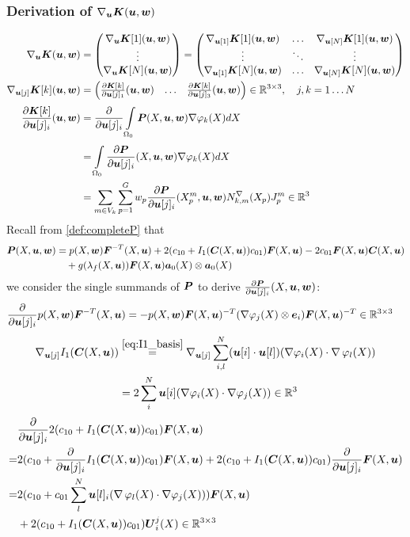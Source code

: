 \subsubsection{Derivation of $\nabla_{\vu}\vK(\vu,\vw)$}
\begin{align*}
	\nabla_{\vu}\vK(\vu,\vw) &= \m{\nabla_{\vu}\vK[1](\vu,\vw)\\ \vdots \\ \nabla_{\vu}\vK[N](\vu,\vw)}
	 = \m{\nabla_{\vu[1]}\vK[1](\vu,\vw) & \ldots & \nabla_{\vu[N]}\vK[1](\vu,\vw)\\
	 	\vdots & \ddots & \vdots\\
	   \nabla_{\vu[1]}\vK[N](\vu,\vw) & \ldots & \nabla_{\vu[N]}\vK[N](\vu,\vw)}\\
	\nabla_{\vu[j]}\vK[k](\vu,\vw) &=\m{\d{\vK[k]}{\vu[j]_1}(\vu,\vw) & \ldots & \d{\vK[k]}{\vu[j]_3}(\vu,\vw)}\in\R^{3\times 3},\quad j,k=1\ldots N\\
	\d{\vK[k]}{\vu[j]_i}(\vu,\vw) &= \d{}{\vu[j]_i} \intor\vP(X,\vu,\vw)\dpk dX\\
		&=  \intor\d{\vP}{\vu[j]_i}(X,\vu,\vw) \dpk dX\\
		&= \sumvk\sumgp w_p \d{\vP}{\vu[j]_i}(\pmp,\vu,\vw) \dNkmp\jmp\in\R^3
\end{align*}
Recall from \eqref{def:completeP} that
\begin{align*}
\vP(X,\vu,\vw) &= p(X,\vw)\vF^{-T}(X,\vu) + 2(c_{10} + I_1(\vC(X,\vu))c_{01})\vF(X,\vu) - 2c_{01}\vF(X,\vu)\vC(X,\vu)\\
	     &\quad+g(\lambda_f(X,\vu))\vF(X,\vu)\va_0(X)\otimes\va_0(X)
\end{align*}
we consider the single summands of $\vP$ to derive $\d{\vP}{\vu[j]_i}(X,\vu,\vw)$:
\begin{align*}
	 \d{}{\vu[j]_i}p(X,\vw)\vF^{-T}(X,\vu) &= -p(X,\vw)\vF(X,\vu)^{-T}(\dpj\otimes\ve_i)\vF(X,\vu)^{-T}\in\R^{3\times 3}
\end{align*}
\begin{align*}
	\nabla_{\vu[j]}I_1(\vC(X,\vu)) &\re{eq:I1_basis} \nabla_{\vu[j]}\suml{i,l}{N} (\vu[i] \cdot \vu[l])(\dpi \cdot \divergence\varphi_l(X))\\
	&= 2\suml{i}{N} \vu[i](\dpi \cdot \dpj) \in\R^3
\end{align*}
\begin{align*}	 
	 &\d{}{\vu[j]_i}2(c_{10} + I_1(\vC(X,\vu))c_{01})\vF(X,\vu)\\
	 =& 2(c_{10} + \d{}{\vu[j]_i}I_1(\vC(X,\vu))c_{01})\vF(X,\vu) + 2(c_{10} + I_1(\vC(X,\vu))c_{01})\d{}{\vu[j]_i}\vF(X,\vu)\\
	 =& 2(c_{10} + c_{01}\suml{l}{N} \vu[l]_i(\divergence\varphi_l(X) \cdot \dpj))\vF(X,\vu)\\
	 &+ 2(c_{10} + I_1(\vC(X,\vu))c_{01})\vU^j_i(X)\in\R^{3\times 3}
\end{align*}

